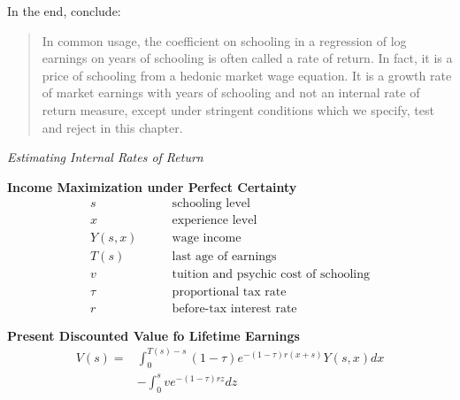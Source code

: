 \begin{frame}
In the end, \cite{Heckman.2006a} conclude:\vspace{0.5cm}

\begin{quote}
In common usage, the coefficient on schooling in a regression of log earnings on years of schooling is often called a rate of return. In fact, it is a price of schooling from a hedonic market wage equation. It is a growth rate of market earnings with years of schooling and not an internal rate of return measure, except under stringent conditions which we specify, test and reject in this chapter.
\end{quote}
\end{frame}
\begin{frame}\begin{center}
\LARGE\textit{Estimating Internal Rates of Return}
\end{center}\end{frame}
\begin{frame}
\textbf{Income Maximization under Perfect Certainty \nocite{Rosen.1977,Willis.1979}}
\begin{align*}
s               &\qquad\text{schooling level} \\
x               &\qquad\text{experience level} \\
Y(s, x)         &\qquad\text{wage income} \\
T(s)            &\qquad\text{last age of earnings} \\
v               &\qquad\text{tuition and psychic cost of schooling} \\
\tau            &\qquad\text{proportional tax rate} \\
r               &\qquad\text{before-tax interest rate}
\end{align*}
\end{frame}

\begin{frame}
\textbf{Present Discounted Value fo Lifetime Earnings}
\begin{align*}
V(s) = & \int_0^{T(s) - s} (1 - \tau) e^{-(1 - \tau)r(x + s)} Y(s,x) dx \\
       & - \int^s_0 ve^{-(1 - \tau)rz}dz
\end{align*}
\end{frame}


